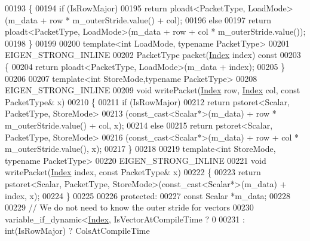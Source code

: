 \begin{DoxyCode}
00193 \textcolor{keyword}{  }\{
00194     \textcolor{keywordflow}{if} (IsRowMajor)
00195       \textcolor{keywordflow}{return} ploadt<PacketType, LoadMode>(m\_data + row * m\_outerStride.value() + col);
00196     \textcolor{keywordflow}{else}
00197       \textcolor{keywordflow}{return} ploadt<PacketType, LoadMode>(m\_data + row + col * m\_outerStride.value());
00198   \}
00199 
00200   \textcolor{keyword}{template}<\textcolor{keywordtype}{int} LoadMode, \textcolor{keyword}{typename} PacketType>
00201   EIGEN\_STRONG\_INLINE
00202   PacketType packet(\hyperlink{namespace_eigen_a62e77e0933482dafde8fe197d9a2cfde}{Index} index)\textcolor{keyword}{ const}
00203 \textcolor{keyword}{  }\{
00204     \textcolor{keywordflow}{return} ploadt<PacketType, LoadMode>(m\_data + index);
00205   \}
00206 
00207   \textcolor{keyword}{template}<\textcolor{keywordtype}{int} StoreMode,\textcolor{keyword}{typename} PacketType>
00208   EIGEN\_STRONG\_INLINE
00209   \textcolor{keywordtype}{void} writePacket(\hyperlink{namespace_eigen_a62e77e0933482dafde8fe197d9a2cfde}{Index} row, \hyperlink{namespace_eigen_a62e77e0933482dafde8fe197d9a2cfde}{Index} col, \textcolor{keyword}{const} PacketType& x)
00210   \{
00211     \textcolor{keywordflow}{if} (IsRowMajor)
00212       \textcolor{keywordflow}{return} pstoret<Scalar, PacketType, StoreMode>
00213                 (\textcolor{keyword}{const\_cast<}Scalar*\textcolor{keyword}{>}(m\_data) + row * m\_outerStride.value() + col, x);
00214     \textcolor{keywordflow}{else}
00215       \textcolor{keywordflow}{return} pstoret<Scalar, PacketType, StoreMode>
00216                     (\textcolor{keyword}{const\_cast<}Scalar*\textcolor{keyword}{>}(m\_data) + row + col * m\_outerStride.value(), x);
00217   \}
00218 
00219   \textcolor{keyword}{template}<\textcolor{keywordtype}{int} StoreMode, \textcolor{keyword}{typename} PacketType>
00220   EIGEN\_STRONG\_INLINE
00221   \textcolor{keywordtype}{void} writePacket(\hyperlink{namespace_eigen_a62e77e0933482dafde8fe197d9a2cfde}{Index} index, \textcolor{keyword}{const} PacketType& x)
00222   \{
00223     \textcolor{keywordflow}{return} pstoret<Scalar, PacketType, StoreMode>(\textcolor{keyword}{const\_cast<}Scalar*\textcolor{keyword}{>}(m\_data) + index, x);
00224   \}
00225 
00226 \textcolor{keyword}{protected}:
00227   \textcolor{keyword}{const} Scalar *m\_data;
00228 
00229   \textcolor{comment}{// We do not need to know the outer stride for vectors}
00230   variable\_if\_dynamic<\hyperlink{namespace_eigen_a62e77e0933482dafde8fe197d9a2cfde}{Index}, IsVectorAtCompileTime  ? 0 
00231                                                     : int(IsRowMajor) ? ColsAtCompileTime 

\end{DoxyCode}
